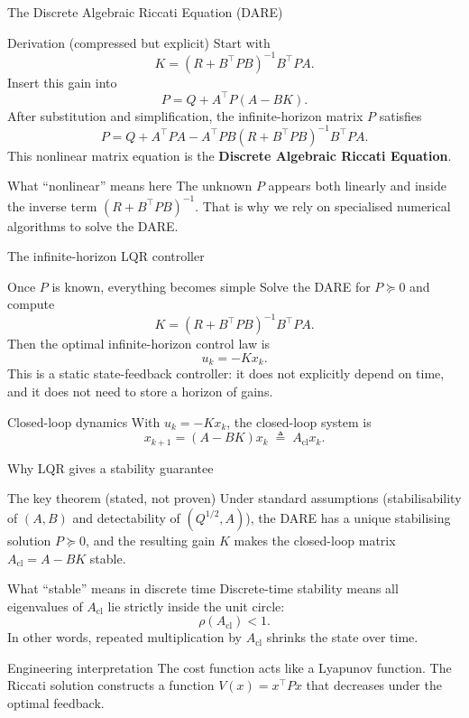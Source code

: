 \documentclass[aspectratio=169,11pt]{beamer}
\begin{document}
\begin{frame}{The Discrete Algebraic Riccati Equation (DARE)}
\begin{block}{Derivation (compressed but explicit)}
Start with
\[
K = (R + B^\top P B)^{-1}B^\top P A.
\]
Insert this gain into
\[
P = Q + A^\top P (A - BK).
\]
After substitution and simplification, the infinite-horizon matrix $P$ satisfies
\[
P = Q + A^\top P A - A^\top P B (R + B^\top P B)^{-1}B^\top P A.
\]
This nonlinear matrix equation is the \textbf{Discrete Algebraic Riccati Equation}.
\end{block}

\begin{alertblock}{What ``nonlinear'' means here}
The unknown $P$ appears both linearly and inside the inverse term $(R+B^\top P B)^{-1}$. That is why we rely on specialised numerical algorithms to solve the DARE.
\end{alertblock}
\end{frame}

\begin{frame}{The infinite-horizon LQR controller}
\begin{block}{Once $P$ is known, everything becomes simple}
Solve the DARE for $P\succeq 0$ and compute
\[
K = (R + B^\top P B)^{-1}B^\top P A.
\]
Then the optimal infinite-horizon control law is
\[
u_k = -Kx_k.
\]
This is a static state-feedback controller: it does not explicitly depend on time, and it does not need to store a horizon of gains.
\end{block}

\begin{block}{Closed-loop dynamics}
With $u_k=-Kx_k$, the closed-loop system is
\[
x_{k+1} = (A-BK)x_k \;\triangleq\; A_{\mathrm{cl}}x_k.
\]
\end{block}
\end{frame}

\begin{frame}{Why LQR gives a stability guarantee}
\begin{block}{The key theorem (stated, not proven)}
Under standard assumptions (stabilisability of $(A,B)$ and detectability of $(Q^{1/2},A)$), the DARE has a unique stabilising solution $P\succeq 0$, and the resulting gain $K$ makes the closed-loop matrix $A_{\mathrm{cl}}=A-BK$ stable.
\end{block}

\begin{block}{What ``stable'' means in discrete time}
Discrete-time stability means all eigenvalues of $A_{\mathrm{cl}}$ lie strictly inside the unit circle:
\[
\rho(A_{\mathrm{cl}}) < 1.
\]
In other words, repeated multiplication by $A_{\mathrm{cl}}$ shrinks the state over time.
\end{block}

\begin{alertblock}{Engineering interpretation}
The cost function acts like a Lyapunov function. The Riccati solution constructs a function $V(x)=x^\top P x$ that decreases under the optimal feedback.
\end{alertblock}
\end{frame}
\end{document}
